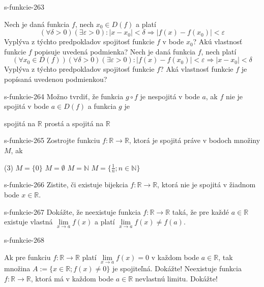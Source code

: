 \begin{defproblem}{s-funkcie-263}
\begin{tasks}
\task
  Nech je daná funkcia $f$, nech $x_0 \in D(f)$ a platí
  \[
    (\forall \delta > 0)
      (\exists \varepsilon >0):
        |x - x_0| < \delta \Rightarrow |f(x)-f(x_0)| < \varepsilon
  \]
  Vyplýva z týchto predpokladov spojitosť funkcie
  $f$ v bode $x_0$? Akú vlastnosť funkcie $f$ popisuje uvedená podmienka?
\task
  Nech je daná funkcia $f$, nech platí
  \[
    (\forall x_0 \in D(f))
      (\forall \delta > 0)
        (\exists \varepsilon > 0):
          |f(x)-f(x_0)| < \varepsilon \Rightarrow |x-x_0| < \delta
  \]
  Vyplýva z týchto predpokladov spojitosť funkcie $f$? Aká vlastnosť funkcie $f$
  je popísaná uvedenou podmienkou?
\end{tasks}
\end{defproblem}

\begin{defproblem}{s-funkcie-264}
Možno tvrdiť, že funkcia $g \circ f$ je nespojitá v bode $a$, ak $f$ nie je spojitá v bode $a \in D(f)$ a funkcia $g$ je
\begin{tasks}
\task spojitá na $\mathbb{R}$
\task prostá a spojitá na $\mathbb{R}$
\end{tasks}
\end{defproblem}

\begin{defproblem}{s-funkcie-265}
Zostrojte funkciu $f: \mathbb{R} \rightarrow \mathbb{R}$, ktorá je spojitá práve
v bodoch množiny $M$, ak
\begin{tasks}(3)
\task $M=\{0\}$
\task $M=\emptyset$
\task $M=\mathbb{N}$
\task $M=\{\frac{1}{n};n \in \mathbb{N}\}$
\end{tasks}
\end{defproblem}

\begin{defproblem}{s-funkcie-266}
Zistite, či existuje bijekcia $f: \mathbb{R} \rightarrow \mathbb{R}$, ktorá nie
je spojitá v žiadnom bode $x \in \mathbb{R}$.
\end{defproblem}

\begin{defproblem}{s-funkcie-267}
Dokážte, že neexistuje funkcia $f: \mathbb{R} \rightarrow \mathbb{R}$ taká, že
pre každé $a \in \mathbb{R}$ existuje vlastná $\lim\limits_{x \rightarrow
a}f(x)$ a platí $\lim\limits_{x \rightarrow a}f(x) \neq f(a)$.
\end{defproblem}

\begin{defproblem}{s-funkcie-268}
\begin{tasks}
\task
  Ak pre funkciu $f: \mathbb{R} \rightarrow \mathbb{R}$ platí $\lim\limits_{x
  \rightarrow a}f(x)=0$ v každom bode $a \in \mathbb{R}$, tak množina $A:=\{x
  \in \mathbb{R};f(x)\neq 0\}$ je spojiteľná. Dokážte!
\task
  Neexistuje funkcia $f: \mathbb{R} \rightarrow \mathbb{R}$, ktorá má v každom
  bode $a \in \mathbb{R}$ nevlastnú limitu. Dokážte!
\end{tasks}
\end{defproblem}

